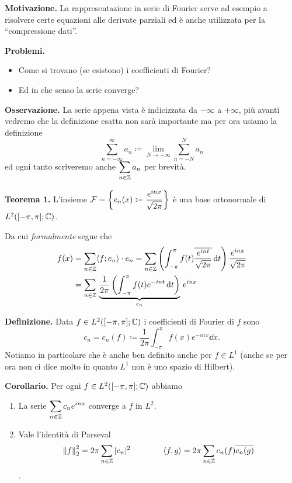 \textbf{Motivazione.}
La rappresentazione in serie di Fourier serve ad esempio a risolvere certe equazioni alle derivate parziali ed è anche utilizzata per la ``compressione dati''.

\textbf{Problemi.}
\begin{itemize}
	\item Come si trovano (se esistono) i coefficienti di Fourier?
	\item Ed in che senso la serie converge?
\end{itemize}

\textbf{Osservazione.}
La serie appena vista è indicizzata da $-\infty$ a $+\infty$, più avanti vedremo che la definizione esatta non sarà importante ma per ora usiamo la definizione
$$
\sum_{n=-\infty}^\infty a_n \coloneqq \lim_{N \to +\infty} \sum_{n = -N}^N a_n
$$
ed ogni tanto scriveremo anche $\displaystyle \sum_{n \in \mathbb Z} a_n$ per brevità.

\textbf{Teorema 1.}
L'insieme $\displaystyle\mathcal F = \left\{ e_n(x) \coloneqq \frac{e^{inx}}{\sqrt{2\pi}} \right\}$ è una base ortonormale di $L^2([-\pi, \pi]; \mathbb C)$.

Da cui \textit{formalmente} segue che
$$
\begin{aligned}
	f(x) 
	&= \sum_{n \in \mathbb Z} \langle f; e_n \rangle \cdot e_n
	= \sum_{n \in \mathbb Z} \left( \int_{-\pi}^\pi f(t) \overline{\frac{e^{int}}{\sqrt{2\pi}}} \,\mathrm{d} t \right) \frac{e^{inx}}{\sqrt{2\pi}} \\
	&= \sum_{n \in \mathbb Z} \, \underbrace{\frac{1}{2\pi} \left( \int_{-\pi}^\pi f(t) e^{-int} \,\mathrm{d} t \right)}_{c_n} \, e^{inx}
\end{aligned}
$$

\textbf{Definizione.}
Data $f \in L^2([-\pi, \pi]; \mathbb C)$ i coefficienti di Fourier di $f$ sono
$$
	c_n = c_n(f) \coloneqq \frac{1}{2\pi} \int_{-\pi}^\pi f(x) e^{-inx} \dd x.
$$
Notiamo in particolare che è anche ben definito anche per $f \in L^1$ (anche se per ora non ci dice molto in quanto $L^1$ non è uno spazio di Hilbert).

\textbf{Corollario.}
Per ogni $f \in L^2([-\pi, \pi]; \mathbb C)$ abbiamo
\begin{enumerate}
	\item \label{item:4nov2021_cor1_1} 
		La serie $\displaystyle \sum_{n \in \mathbb Z} c_n e^{inx}$ converge a $f$ in $L^2$.

	\item Vale l'identità di Parseval
		$$
		\left\lVert f \right\rVert_2^2 = 2 \pi \sum_{n \in \mathbb Z} |c_n|^2
		\qquad
		\qquad
		\langle f, g \rangle = 2\pi \sum_{n \in \mathbb Z} c_n(f) \overline{c_n(g)}
		$$.
\end{enumerate}

